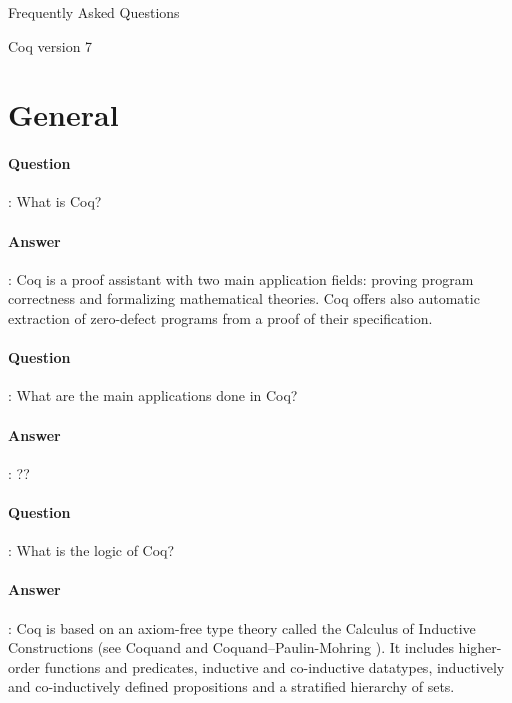 \documentclass{article}
\begin{document}

\begin{center}
\begin{Large}
Frequently Asked Questions
\end{Large}
\medskip
Coq version 7
\end{center}

\section{General}

\paragraph{Question}: What is Coq?

\paragraph{Answer}: Coq is a proof assistant with two main
application fields: proving program correctness and formalizing mathematical
theories. Coq offers also automatic extraction of zero-defect programs
from a proof of their specification.

\paragraph{Question}: What are the main applications done in Coq?

\paragraph{Answer}: ??

\paragraph{Question}: What is the logic of Coq?

\paragraph{Answer}: Coq is based on an axiom-free type theory called
the Calculus of Inductive Constructions (see Coquand \cite{Coquand--}
and Coquand--Paulin-Mohring \cite{CoqMoh}). It includes higher-order
functions and predicates, inductive and co-inductive datatypes,
inductively and co-inductively defined propositions and a stratified
hierarchy of sets.
\end{document}
